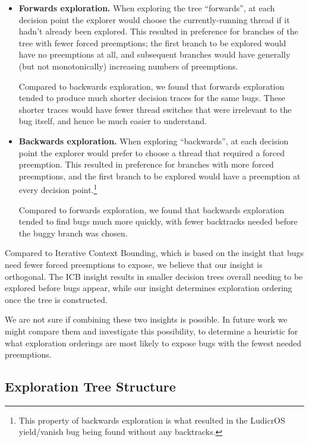 \begin{itemize}
	\item {\bf Forwards exploration.} When exploring the tree ``forwards'', at each decision point the explorer would choose the currently-running thread if it hadn't already been explored. This resulted in preference for branches of the tree with fewer forced preemptions; the first branch to be explored would have no preemptions at all, and subsequent branches would have generally (but not monotonically) increasing numbers of preemptions.

		Compared to backwards exploration, we found that forwards exploration tended to produce much shorter decision traces for the same bugs. These shorter traces would have fewer thread switches that were irrelevant to the bug itself, and hence be much easier to understand.
	\item {\bf Backwards exploration.} When exploring ``backwards'', at each decision point the explorer would prefer to choose a thread that required a forced preemption. This resulted in preference for branches with more forced preemptions, and the first branch to be explored would have a preemption at every decision point.\footnote{
		This property of backwards exploration is what resulted in the LudicrOS yield/vanish bug being found without any backtracks.}

		Compared to forwards exploration, we found that backwards exploration tended to find bugs much more quickly, with fewer backtracks needed before the buggy branch was chosen.
\end{itemize}

Compared to Iterative Context Bounding\cite{chess}, which is based on the insight that bugs need fewer forced preemptions to expose, we believe that our insight is orthogonal. The ICB insight results in smaller decision trees overall needing to be explored before bugs appear, while our insight determines exploration ordering once the tree is constructed.

We are not sure if combining these two insights is possible. In future work we might compare them and investigate this possibility, to determine a heuristic for what exploration orderings are most likely to expose bugs with the fewest needed preemptions.

\subsection{Exploration Tree Structure}
\label{sec:future-nadim}

